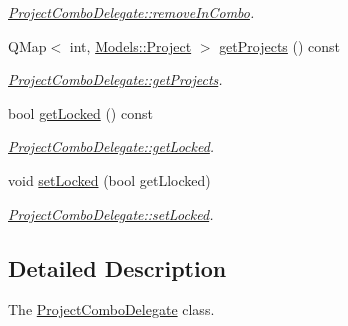 \begin{DoxyCompactItemize}
\begin{DoxyCompactList}\small\item\em \hyperlink{classGui_1_1Widgets_1_1Delegates_1_1ProjectComboDelegate_a7e14627b3942a96f190e31a4e67edc95}{Project\-Combo\-Delegate\-::remove\-In\-Combo}. \end{DoxyCompactList}\item 
Q\-Map$<$ int, \hyperlink{classModels_1_1Project}{Models\-::\-Project} $>$ \hyperlink{classGui_1_1Widgets_1_1Delegates_1_1ProjectComboDelegate_a63d0ef3a5179d72ab577f359c8f7a6fa}{get\-Projects} () const 
\begin{DoxyCompactList}\small\item\em \hyperlink{classGui_1_1Widgets_1_1Delegates_1_1ProjectComboDelegate_a63d0ef3a5179d72ab577f359c8f7a6fa}{Project\-Combo\-Delegate\-::get\-Projects}. \end{DoxyCompactList}\item 
bool \hyperlink{classGui_1_1Widgets_1_1Delegates_1_1ProjectComboDelegate_ad07bf1e09c752159161a3f585c61b4d7}{get\-Locked} () const 
\begin{DoxyCompactList}\small\item\em \hyperlink{classGui_1_1Widgets_1_1Delegates_1_1ProjectComboDelegate_ad07bf1e09c752159161a3f585c61b4d7}{Project\-Combo\-Delegate\-::get\-Locked}. \end{DoxyCompactList}\item 
void \hyperlink{classGui_1_1Widgets_1_1Delegates_1_1ProjectComboDelegate_ac93369dde11856d4097851f7f1158f48}{set\-Locked} (bool get\-Llocked)
\begin{DoxyCompactList}\small\item\em \hyperlink{classGui_1_1Widgets_1_1Delegates_1_1ProjectComboDelegate_ac93369dde11856d4097851f7f1158f48}{Project\-Combo\-Delegate\-::set\-Locked}. \end{DoxyCompactList}\end{DoxyCompactItemize}


\subsection{Detailed Description}
The \hyperlink{classGui_1_1Widgets_1_1Delegates_1_1ProjectComboDelegate}{Project\-Combo\-Delegate} class. 

